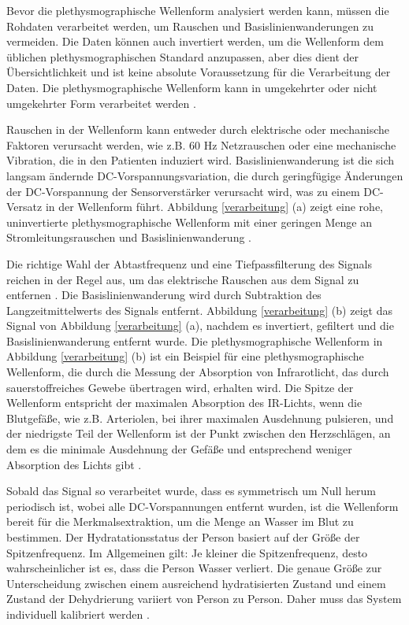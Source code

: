 \documentclass[10pt,a4paper,headinclude,twoside, plainheadsepline, open=right, numbers=noenddot, twocolumn]{article}
\begin{document}
Bevor die plethysmographische Wellenform analysiert werden kann, müssen die Rohdaten verarbeitet werden, um Rauschen und Basislinienwanderungen zu vermeiden. 
Die Daten können auch invertiert werden, um die Wellenform dem üblichen plethysmographischen Standard anzupassen, aber dies dient der Übersichtlichkeit und ist keine absolute Voraussetzung für die Verarbeitung der Daten. 
Die plethysmographische Wellenform kann in umgekehrter oder nicht umgekehrter Form verarbeitet werden \cite{mcpherson2015systems}.

Rauschen in der Wellenform kann entweder durch elektrische oder mechanische Faktoren verursacht werden, wie z.B. 60 Hz Netzrauschen oder eine mechanische Vibration, die in den Patienten induziert wird. 
Basislinienwanderung ist die sich langsam ändernde DC-Vorspannungsvariation, die durch geringfügige Änderungen der DC-Vorspannung der Sensorverstärker verursacht wird, was zu einem DC-Versatz in der Wellenform führt. 
Abbildung \ref{verarbeitung} (a) zeigt eine rohe, uninvertierte plethysmographische Wellenform mit einer geringen Menge an Stromleitungsrauschen und Basislinienwanderung \cite{mcpherson2015systems}.

Die richtige Wahl der Abtastfrequenz und eine Tiefpassfilterung des Signals reichen in der Regel aus, um das elektrische Rauschen aus dem Signal zu entfernen \cite{mcpherson2015systems, suryadevara2015towards}. 
Die Basislinienwanderung wird durch Subtraktion des Langzeitmittelwerts des Signals entfernt. 
Abbildung \ref{verarbeitung} (b) zeigt das Signal von Abbildung \ref{verarbeitung} (a), nachdem es invertiert, gefiltert und die Basislinienwanderung entfernt wurde. 
Die plethysmographische Wellenform in Abbildung \ref{verarbeitung} (b) ist ein Beispiel für eine plethysmographische Wellenform, die durch die Messung der Absorption von Infrarotlicht, das durch sauerstoffreiches Gewebe übertragen wird, erhalten wird.
Die Spitze der Wellenform entspricht der maximalen Absorption des IR-Lichts, wenn die Blutgefäße, wie z.B. Arteriolen, bei ihrer maximalen Ausdehnung pulsieren, und der niedrigste Teil der Wellenform ist der Punkt zwischen den Herzschlägen, an dem es die minimale Ausdehnung der Gefäße und entsprechend weniger Absorption des Lichts gibt \cite{mcpherson2015systems}.

Sobald das Signal so verarbeitet wurde, dass es symmetrisch um Null herum periodisch ist, wobei alle DC-Vorspannungen entfernt wurden, ist die Wellenform bereit für die Merkmalsextraktion, um die Menge an Wasser im Blut zu bestimmen.
Der Hydratationsstatus der Person basiert auf der Größe der Spitzenfrequenz.
Im Allgemeinen gilt: Je kleiner die Spitzenfrequenz, desto wahrscheinlicher ist es, dass die Person Wasser verliert. 
Die genaue Größe zur Unterscheidung zwischen einem ausreichend hydratisierten Zustand und einem Zustand der Dehydrierung variiert von Person zu Person. 
Daher muss das System individuell kalibriert werden \cite{mcpherson2015systems}. 
\end{document}
